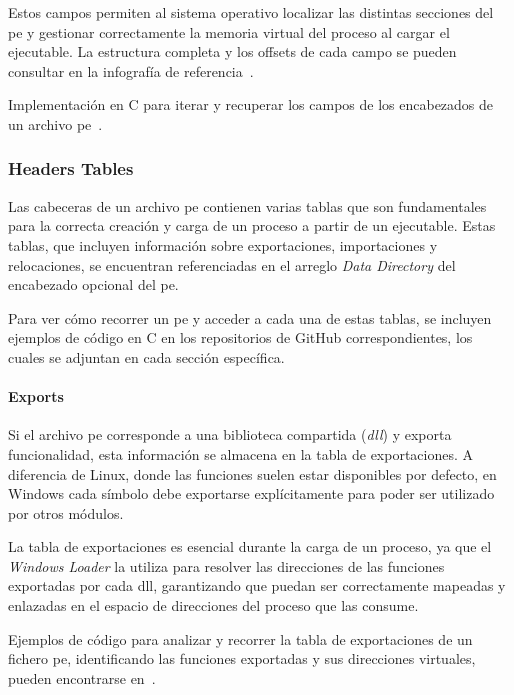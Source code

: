 Estos campos permiten al sistema operativo localizar las distintas secciones del \acrshort{pe} y gestionar correctamente la memoria virtual del proceso al cargar el ejecutable. La estructura completa y los offsets de cada campo se pueden consultar en la infografía de referencia~\cite{peinfografia}.

Implementación en C para iterar y recuperar los campos de los encabezados de un archivo \acrshort{pe}~\cite{walking_PE_headers}.

\subsubsection{Headers Tables}

Las cabeceras de un archivo \acrshort{pe} contienen varias tablas que son fundamentales para la correcta creación y carga de un proceso a partir de un ejecutable.  
Estas tablas, que incluyen información sobre exportaciones, importaciones y relocaciones, se encuentran referenciadas en el arreglo \textit{Data Directory} del encabezado opcional del \acrshort{pe}.

Para ver cómo recorrer un \acrshort{pe} y acceder a cada una de estas tablas, se incluyen ejemplos de código en C en los repositorios de GitHub correspondientes, los cuales se adjuntan en cada sección específica.

\paragraph{Exports}

Si el archivo \acrshort{pe} corresponde a una biblioteca compartida (\textit{\acrshort{dll}}) y exporta funcionalidad, 
esta información se almacena en la tabla de exportaciones.  
A diferencia de Linux, donde las funciones suelen estar disponibles por defecto, en Windows 
cada símbolo debe exportarse explícitamente para poder ser utilizado por otros módulos.

La tabla de exportaciones es esencial durante la carga de un proceso, ya que el \textit{Windows Loader} 
la utiliza para resolver las direcciones de las funciones exportadas por cada \acrshort{dll}, garantizando que puedan 
ser correctamente mapeadas y enlazadas en el espacio de direcciones del proceso que las consume.

Ejemplos de código para analizar y recorrer la tabla de exportaciones de un fichero \acrshort{pe}, 
identificando las funciones exportadas y sus direcciones virtuales, pueden encontrarse en~\cite{walking_PE_exports}.  

